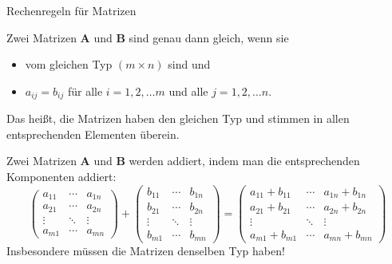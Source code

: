 \begin{frame}{Rechenregeln für Matrizen}
	\begin{bemerkung}
		Zwei Matrizen $\pmb{A}$ und $\pmb{B}$ sind genau dann gleich, wenn sie
		\begin{itemize}
			\item vom gleichen Typ $(m \times n)$ sind und
			\item $a_{ij} = b_{ij}$ für alle $i= 1, 2, \ldots m$ und alle $j= 1, 2, \ldots n$.
		\end{itemize}
		Das heißt, die Matrizen haben den gleichen Typ und stimmen in allen entsprechenden Elementen überein.
\end{bemerkung}
\begin{bemerkung}
	
Zwei Matrizen $\pmb{A}$ und $\pmb{B}$ werden addiert, indem man die entsprechenden Komponenten addiert:
\scriptsize{
\[
\begin{pmatrix}
a_{11} & \cdots & a_{1n} \\
a_{21} & \cdots & a_{2n} \\
\vdots & \ddots & \vdots \\
a_{m1} & \cdots & a_{mn}
\end{pmatrix} + \begin{pmatrix}
b_{11} & \cdots & b_{1n} \\
b_{21} & \cdots & b_{2n} \\
\vdots & \ddots & \vdots \\
b_{m1} & \cdots & b_{mn}
\end{pmatrix} = \begin{pmatrix}
a_{11} + b_{11} & \cdots & a_{1n} + b_{1n} \\
a_{21} + b_{21} & \cdots & a_{2n} +b_{2n}\\
\vdots & \ddots & \vdots \\
a_{m1} + b_{m1} & \cdots & a_{mn} + b_{mn}
\end{pmatrix}
\]
}{\normalsize
Insbesondere müssen die Matrizen denselben Typ haben!}
\end{bemerkung}
\end{frame}

